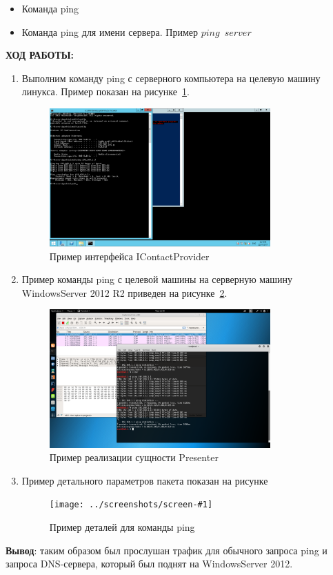 \documentclass[14pt,a4paper]{extreport}
\newcommand{\screenshot}[3]{\begin{figure}[ht]%
\centering%
\texttt{[image: ../screenshots/screen-\#1]}%
\caption{#2}%
\label{#3}%
\end{figure}%
}
\begin{document}
\begin{itemize}
\item Команда ping
\item Команда ping для имени сервера. Пример $ping$~$server$
\end{itemize}

\clearpage

\begin{center}
\textbf{ХОД РАБОТЫ:}
\end{center}


\begin{enumerate}

\item Выполним команду ping с серверного компьютера на целевую машину линукса. Пример показан на рисунке~\ref{picture1}.

\begin{figure}[ht]
\centering
\includegraphics[width=0.8\textwidth]{../screenshots/screen-1}
\caption{Пример интерфейса IContactProvider}
\label{picture1}
\end{figure}

\item Пример команды ping с целевой машины на серверную машину WindowsServer 2012 R2 приведен на рисунке~\ref{picture2}.

\begin{figure}[ht]
\centering
\includegraphics[width=0.8\textwidth]{../screenshots/screen-2}
\caption{Пример реализации сущности Presenter}
\label{picture2}
\end{figure}

\item Пример детального параметров пакета показан на рисунке

\screenshot{3}{Пример деталей для команды ping}{3}

\end{enumerate}

\clearpage

\textbf{Вывод}: таким образом был прослушан трафик для обычного запроса ping и запроса DNS-сервера, который был поднят на WindowsServer 2012.
\end{document}
